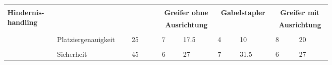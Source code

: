 \documentclass[main.tex]{subfiles} %
\begin{document}
\begin{landscape}
    \newpage
    \begin{table}[H]
        \centering
        \begin{tabular}{|p{0.11\linewidth}|p{0.18\linewidth}|p{0.085\linewidth}|p{0.057\linewidth}|p{0.07\linewidth}|p{0.057\linewidth}|p{0.07\linewidth}|p{0.057\linewidth}|p{0.07\linewidth}|}
            \hline
                                                           & \multicolumn{2}{c|}{}               & \multicolumn{2}{c|}{}                      & \multicolumn{2}{c|}{}                       & \multicolumn{2}{c|}{}                                                             \\[-9pt]
            \multirow{6}{4em}{\textbf{Hindernis-handling}} & \multicolumn{2}{c|}{}               & \multicolumn{2}{c|}{\textbf{Greifer ohne}} & \multicolumn{2}{c|}{\textbf{Gabelstapler}}  & \multicolumn{2}{c|}{\textbf{Greifer mit}}                                         \\[1pt]
                                                           & \multicolumn{2}{c|}{}               & \multicolumn{2}{c|}{\textbf{Ausrichtung}}  & \multicolumn{2}{c|}{\textbf{}}              & \multicolumn{2}{c|}{\textbf{Ausrichtung}}                                         \\[1pt]
            \cline{2-9}
                                                           &                                     &                                            &                                             &                                             &   &               &   &             \\[-9pt]
                                                           & Platziergenauigkeit                 & 25                                         & 7                                           & 17.5                                        & 4 & 10            & 8 & 20          \\[1pt]
            \cline{2-9}
                                                           &                                     &                                            &                                             &                                             &   &               &   &             \\[-9pt]
                                                           & Sicherheit                          & 45                                         & 6                                           & 27                                          & 7 & 31.5          & 6 & 27          \\[1pt]

\end{tabular}
\end{table}
\end{landscape}
\end{document}
